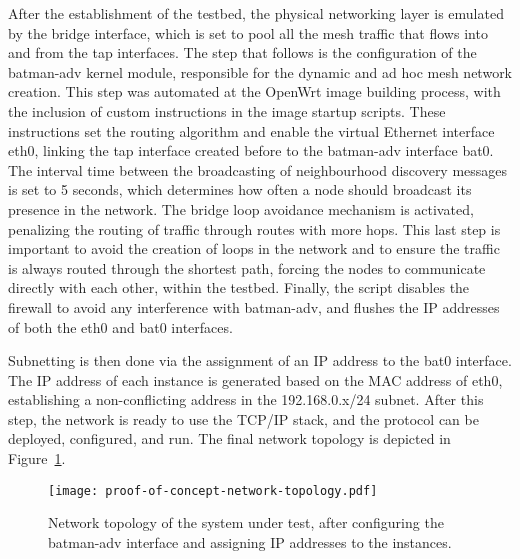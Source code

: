 After the establishment of the testbed, the physical networking layer is emulated by the bridge interface, which is set to pool all the mesh traffic that flows into and from the tap interfaces. The step that follows is the configuration of the batman-adv kernel module, responsible for the dynamic and ad hoc mesh network creation. This step was automated at the OpenWrt image building process, with the inclusion of custom instructions in the image startup scripts. These instructions set the routing algorithm and enable the virtual Ethernet interface eth0, linking the tap interface created before to the batman-adv interface bat0. The interval time between the broadcasting of neighbourhood discovery messages is set to 5 seconds, which determines how often a node should broadcast its presence in the network. The bridge loop avoidance mechanism is activated, penalizing the routing of traffic through routes with more hops. This last step is important to avoid the creation of loops in the network and to ensure the traffic is always routed through the shortest path, forcing the nodes to communicate directly with each other, within the testbed. Finally, the script disables the firewall to avoid any interference with batman-adv, and flushes the IP addresses of both the eth0 and bat0 interfaces.

Subnetting is then done via the assignment of an IP address to the bat0 interface. The IP address of each instance is generated based on the MAC address of eth0, establishing a non-conflicting address in the 192.168.0.x/24 subnet. After this step, the network is ready to use the TCP/IP stack, and the \pol{} protocol can be deployed, configured, and run. The final network topology is depicted in Figure~\ref{fig:infrastructure:network-architecture}.

\begin{figure}[h!]
    \begin{center}
    \texttt{[image: proof-of-concept-network-topology.pdf]}
    \caption{Network topology of the system under test, after configuring the batman-adv interface and assigning IP addresses to the instances.}
    \label{fig:infrastructure:network-architecture}
    \end{center}
\end{figure}